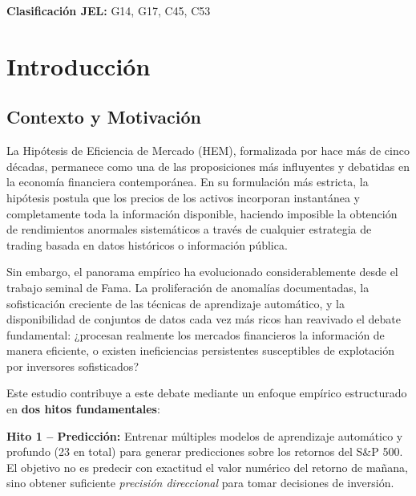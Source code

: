 \documentclass[11pt,a4paper]{article}
\begin{document}
\vspace{0.5cm}

\textbf{Clasificación JEL:} G14, G17, C45, C53

\vspace{1cm}

\tableofcontents
\newpage

\section{Introducción}

\subsection{Contexto y Motivación}

La Hipótesis de Eficiencia de Mercado (HEM), formalizada por \citet{fama1970} hace más de cinco décadas, permanece como una de las proposiciones más influyentes y debatidas en la economía financiera contemporánea. En su formulación más estricta, la hipótesis postula que los precios de los activos incorporan instantánea y completamente toda la información disponible, haciendo imposible la obtención de rendimientos anormales sistemáticos a través de cualquier estrategia de trading basada en datos históricos o información pública.

Sin embargo, el panorama empírico ha evolucionado considerablemente desde el trabajo seminal de Fama. La proliferación de anomalías documentadas, la sofisticación creciente de las técnicas de aprendizaje automático, y la disponibilidad de conjuntos de datos cada vez más ricos han reavivado el debate fundamental: ¿procesan realmente los mercados financieros la información de manera eficiente, o existen ineficiencias persistentes susceptibles de explotación por inversores sofisticados?

Este estudio contribuye a este debate mediante un enfoque empírico estructurado en \textbf{dos hitos fundamentales}:

\textbf{Hito 1 -- Predicción:} Entrenar múltiples modelos de aprendizaje automático y profundo (23 en total) para generar predicciones sobre los retornos del S\&P 500. El objetivo no es predecir con exactitud el valor numérico del retorno de mañana, sino obtener suficiente \textit{precisión direccional} para tomar decisiones de inversión.
\end{document}
